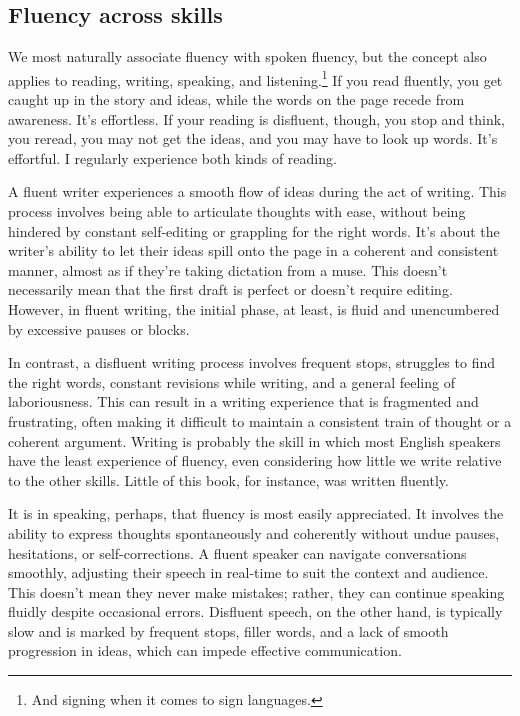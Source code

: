 \subsection{Fluency across skills}

We most naturally associate fluency with spoken fluency, but the concept also applies to reading, writing, speaking, and listening.\footnote{And signing when it comes to sign languages.} If you read fluently, you get caught up in the story and ideas, while the words on the page recede from awareness. It's effortless. If your reading is disfluent, though, you stop and think, you reread, you may not get the ideas, and you may have to look up words. It's effortful. I regularly experience both kinds of reading.

A fluent writer experiences a smooth flow of ideas during the act of writing. This process involves being able to articulate thoughts with ease, without being hindered by constant self-editing or grappling for the right words. It's about the writer's ability to let their ideas spill onto the page in a coherent and consistent manner, almost as if they're taking dictation from a muse. This doesn't necessarily mean that the first draft is perfect or doesn't require editing. However, in fluent writing, the initial phase, at least, is fluid and unencumbered by excessive pauses or blocks.

In contrast, a disfluent writing process involves frequent stops, struggles to find the right words, constant revisions while writing, and a general feeling of laboriousness. This can result in a writing experience that is fragmented and frustrating, often making it difficult to maintain a consistent train of thought or a coherent argument. Writing is probably the skill in which most English speakers have the least experience of fluency, even considering how little we write relative to the other skills. Little of this book, for instance, was written fluently.

It is in speaking, perhaps, that fluency is most easily appreciated. It involves the ability to express thoughts spontaneously and coherently without undue pauses, hesitations, or self-corrections. A fluent speaker can navigate conversations smoothly, adjusting their speech in real-time to suit the context and audience. This doesn't mean they never make mistakes; rather, they can continue speaking fluidly despite occasional errors. Disfluent speech, on the other hand, is typically slow and is marked by frequent stops, filler words, and a lack of smooth progression in ideas, which can impede effective communication.

